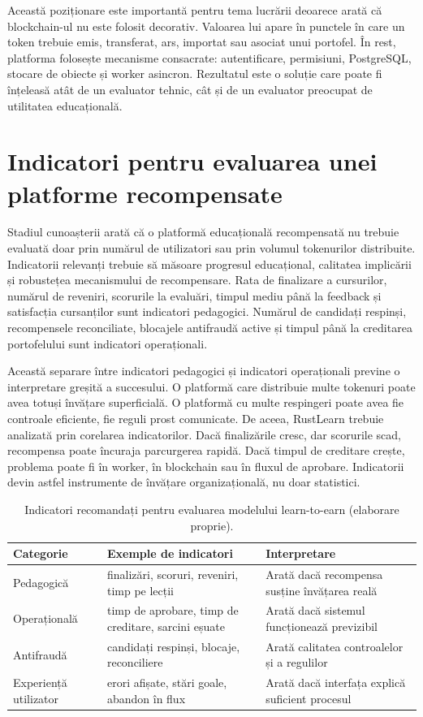 Această poziționare este importantă pentru tema lucrării deoarece arată că blockchain-ul nu este folosit decorativ. Valoarea lui apare în punctele în care un token trebuie emis, transferat, ars, importat sau asociat unui portofel. În rest, platforma folosește mecanisme consacrate: autentificare, permisiuni, PostgreSQL, stocare de obiecte și worker asincron. Rezultatul este o soluție care poate fi înțeleasă atât de un evaluator tehnic, cât și de un evaluator preocupat de utilitatea educațională.

\section{Indicatori pentru evaluarea unei platforme recompensate}
Stadiul cunoașterii arată că o platformă educațională recompensată nu trebuie evaluată doar prin numărul de utilizatori sau prin volumul tokenurilor distribuite. Indicatorii relevanți trebuie să măsoare progresul educațional, calitatea implicării și robustețea mecanismului de recompensare. Rata de finalizare a cursurilor, numărul de reveniri, scorurile la evaluări, timpul mediu până la feedback și satisfacția cursanților sunt indicatori pedagogici. Numărul de candidați respinși, recompensele reconciliate, blocajele antifraudă active și timpul până la creditarea portofelului sunt indicatori operaționali.

Această separare între indicatori pedagogici și indicatori operaționali previne o interpretare greșită a succesului. O platformă care distribuie multe tokenuri poate avea totuși învățare superficială. O platformă cu multe respingeri poate avea fie controale eficiente, fie reguli prost comunicate. De aceea, RustLearn trebuie analizată prin corelarea indicatorilor. Dacă finalizările cresc, dar scorurile scad, recompensa poate încuraja parcurgerea rapidă. Dacă timpul de creditare crește, problema poate fi în worker, în blockchain sau în fluxul de aprobare. Indicatorii devin astfel instrumente de învățare organizațională, nu doar statistici.

\begin{table}[H]
    \centering
    \caption{Indicatori recomandați pentru evaluarea modelului learn-to-earn (elaborare proprie).}
    \label{tab:indicatori_learntoearn}
    \begin{tabular}{P{3.6cm}P{5.2cm}P{4.8cm}}
        \toprule
        Categorie & Exemple de indicatori & Interpretare \\
        \midrule
        Pedagogică & finalizări, scoruri, reveniri, timp pe lecții & Arată dacă recompensa susține învățarea reală \\
        Operațională & timp de aprobare, timp de creditare, sarcini eșuate & Arată dacă sistemul funcționează previzibil \\
        Antifraudă & candidați respinși, blocaje, reconciliere & Arată calitatea controalelor și a regulilor \\
        Experiență utilizator & erori afișate, stări goale, abandon în flux & Arată dacă interfața explică suficient procesul \\
        \bottomrule
    \end{tabular}
\end{table}
